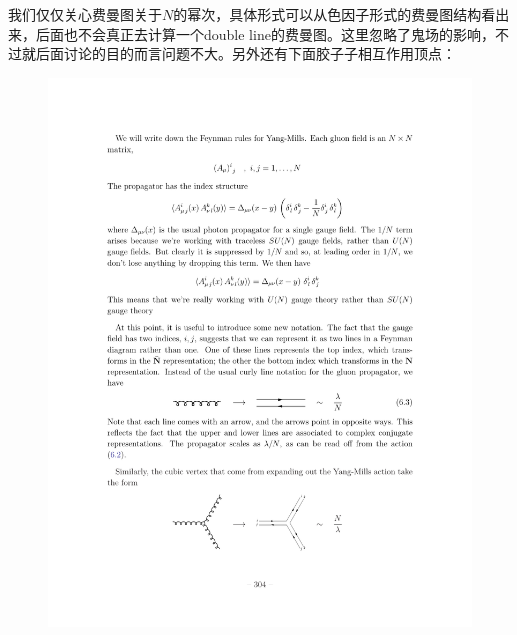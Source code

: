 我们仅仅关心费曼图关于$N$的幂次，具体形式可以从色因子形式的费曼图结构看出来，后面也不会真正去计算一个double line的费曼图。这里忽略了鬼场的影响，不过就后面讨论的目的而言问题不大。另外还有下面胶子子相互作用顶点：
\begin{figure}[H]
	\centering
	\includegraphics{figs/fig15.pdf}
\end{figure}
